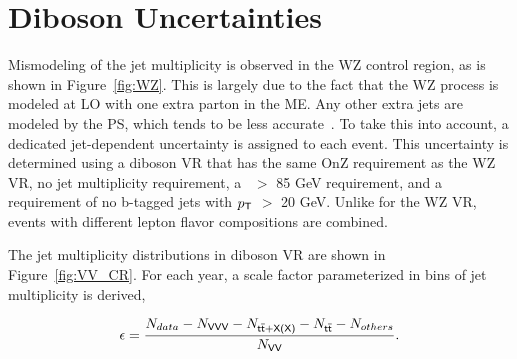 \section{Diboson Uncertainties}
\label{sec:DiUnc}

Mismodeling of the jet multiplicity is observed in the WZ control region, as is shown in Figure~\ref{fig:WZ}. This is largely due to the fact that the WZ process is modeled at \ac{LO} with one extra parton in the \ac{ME}. Any other extra jets are modeled by the \ac{PS}, which tends to be less accurate~\cite{CMS:2018sgc,CMS:2020mpn}. To take this into account, a dedicated jet-dependent uncertainty is assigned to each event. This uncertainty is determined using a diboson \ac{VR} that has the same OnZ requirement as the WZ \ac{VR}, no jet multiplicity requirement, a \MET~$>$ 85 GeV requirement, and a requirement of no b-tagged jets with $p_{\textsf{T}}$ $>$ 20 GeV. Unlike for the WZ \ac{VR}, events with different lepton flavor compositions are combined.

The jet multiplicity distributions in diboson \ac{VR} are shown in Figure~\ref{fig:VV_CR}. For each year, a scale factor parameterized in bins of jet multiplicity is derived,

\begin{equation}
\epsilon=\frac{N_{data}-N_{\textsf{VVV}}-N_{\textsf{t}\overline{\textsf{t}}+\textsf{X(X)}}-N_{\textsf{t}\overline{\textsf{t}}}-N_{others}}{N_{\textsf{VV}}}.
\end{equation}

